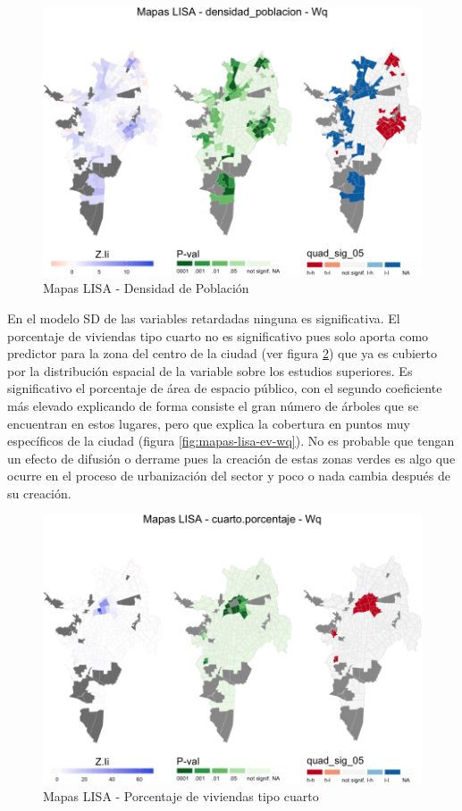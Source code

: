 \documentclass[12pt,]{book}
\begin{document}
\begin{figure}
\includegraphics[width=1\linewidth]{tesis-unigis_files/figure-latex/lisa-densidadpob-1} \caption{Mapas LISA - Densidad de Población}\label{fig:lisa-densidadpob}
\end{figure}

En el modelo SD de las variables retardadas ninguna es significativa. El
porcentaje de viviendas tipo cuarto no es significativo pues solo aporta
como predictor para la zona del centro de la ciudad (ver figura
\ref{fig:lisa-cuarto}) que ya es cubierto por la distribución espacial
de la variable sobre los estudios superiores. Es significativo el
porcentaje de área de espacio público, con el segundo coeficiente más
elevado explicando de forma consiste el gran número de árboles que se
encuentran en estos lugares, pero que explica la cobertura en puntos muy
específicos de la ciudad (figura \ref{fig:mapas-lisa-ev-wq}). No es
probable que tengan un efecto de difusión o derrame pues la creación de
estas zonas verdes es algo que ocurre en el proceso de urbanización del
sector y poco o nada cambia después de su creación.

\begin{figure}
\includegraphics[width=1\linewidth]{tesis-unigis_files/figure-latex/lisa-cuarto-1} \caption{Mapas LISA - Porcentaje de viviendas tipo cuarto}\label{fig:lisa-cuarto}
\end{figure}
\end{document}
